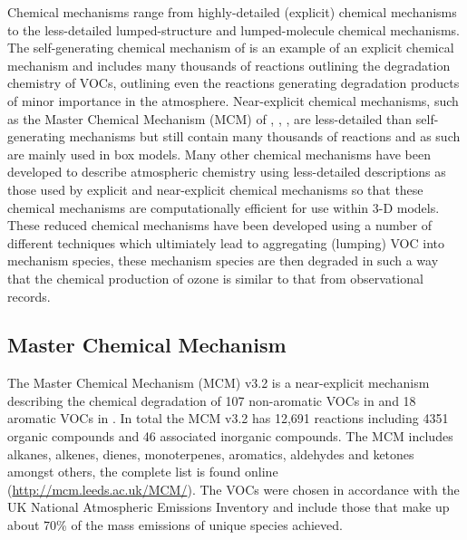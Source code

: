 Chemical mechanisms range from highly-detailed (explicit) chemical mechanisms to the less-detailed lumped-structure and lumped-molecule chemical mechanisms.
The self-generating chemical mechanism of \citet{Aumont:2005} is an example of an explicit chemical mechanism and includes many thousands of reactions outlining the degradation chemistry of VOCs, outlining even the reactions generating degradation products of minor importance in the atmosphere.
Near-explicit chemical mechanisms, such as the Master Chemical Mechanism (MCM) of \citet{Jenkin:1997}, \citet{Jenkin:2003}, \citet{Saunders:2003}, are less-detailed than self-generating mechanisms but still contain many thousands of reactions and as such are mainly used in box models.
Many other chemical mechanisms have been developed to describe atmospheric chemistry using less-detailed descriptions as those used by explicit and near-explicit chemical mechanisms so that these chemical mechanisms are computationally efficient for use within 3-D models.
These reduced chemical mechanisms have been developed using a number of different techniques which ultimiately lead to aggregating (lumping) VOC into mechanism species, these mechanism species are then degraded in such a way that the chemical production of ozone is similar to that from observational records.
\subsection{Master Chemical Mechanism}
The Master Chemical Mechanism (MCM) v3.2 is a near-explicit mechanism describing the chemical degradation of 107 non-aromatic VOCs in \citep{Saunders:2003} and 18 aromatic VOCs in \citep{Jenkin:2003}. 
In total the MCM v3.2 has 12,691 reactions including 4351 organic compounds and 46 associated inorganic compounds. 
The MCM includes alkanes, alkenes, dienes, monoterpenes, aromatics, aldehydes and ketones amongst others, the complete list is found online (\url{http://mcm.leeds.ac.uk/MCM/}). 
The VOCs were chosen in accordance with the UK National Atmospheric Emissions Inventory and include those that make up about 70\% of the mass emissions of unique species achieved.

